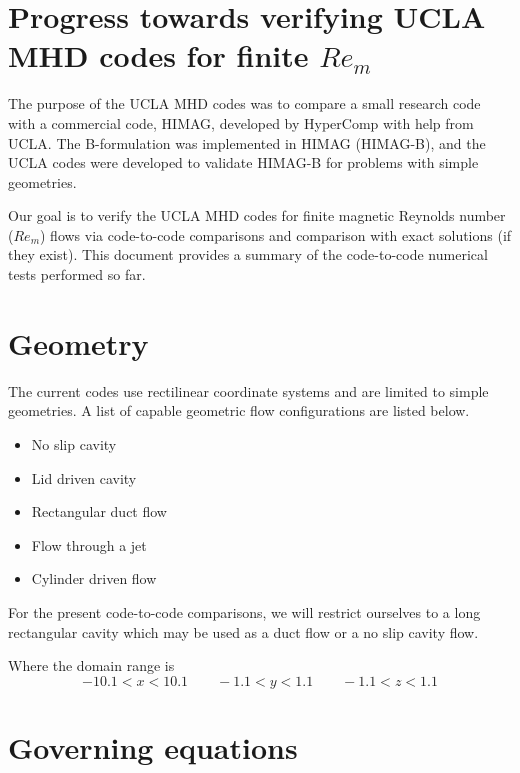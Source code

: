 \documentclass[11pt]{article}
\newcommand{\ffigS}{15.1em}
\newcommand{\ffigH}{\ffigS}
\newcommand{\ffigW}{\ffigS}
\begin{document}
\doublespacing
\MOONSTITLE
\maketitle

\section{Progress towards verifying UCLA MHD codes for finite \texorpdfstring{$Re_m$}{Rm}}
The purpose of the UCLA MHD codes was to compare a small research code with a commercial code, HIMAG, developed by HyperComp with help from UCLA. The B-formulation was implemented in HIMAG (HIMAG-B), and the UCLA codes were developed to validate HIMAG-B for problems with simple geometries.

Our goal is to verify the UCLA MHD codes for finite magnetic Reynolds number ($Re_m$) flows via code-to-code comparisons and comparison with exact solutions (if they exist). This document provides a summary of the code-to-code numerical tests performed so far.


\section{Geometry}
The current codes use rectilinear coordinate systems and are limited to simple geometries. A list of capable geometric flow configurations are listed below.

\begin{itemize}
\item No slip cavity
\item Lid driven cavity
\item Rectangular duct flow
\item Flow through a jet
\item Cylinder driven flow
\end{itemize}

For the present code-to-code comparisons, we will restrict ourselves to a long rectangular cavity which may be used as a duct flow or a no slip cavity flow.


Where the domain range is
\begin{equation}
	-10.1 < x < 10.1 \qquad -1.1 < y < 1.1 \qquad -1.1 < z < 1.1
\end{equation}

\section{Governing equations}
\end{document}
